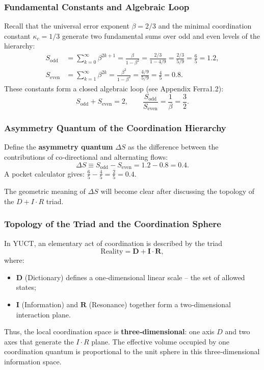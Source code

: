 \documentclass[12pt,a4paper]{article}
\begin{document}
	\subsubsection{Fundamental Constants and Algebraic Loop}
	
	Recall that the universal error exponent \(\beta = 2/3\) and the minimal coordination constant \(\kappa_c = 1/3\) generate two fundamental sums over odd and even levels of the hierarchy:
	\begin{align}
		S_{\mathrm{odd}} &= \sum_{k=0}^{\infty} \beta^{2k+1} = \frac{\beta}{1-\beta^2} = \frac{2/3}{1-4/9} = \frac{2/3}{5/9} = \frac{6}{5} = 1.2, \label{eq:Sodd_again}\\
		S_{\mathrm{even}} &= \sum_{k=1}^{\infty} \beta^{2k} = \frac{\beta^2}{1-\beta^2} = \frac{4/9}{5/9} = \frac{4}{5} = 0.8. \label{eq:Seven_again}
	\end{align}
	These constants form a closed algebraic loop (see Appendix Ferra1.2):
	\[
	S_{\mathrm{odd}} + S_{\mathrm{even}} = 2, \qquad \frac{S_{\mathrm{odd}}}{S_{\mathrm{even}}} = \frac{1}{\beta} = \frac{3}{2}.
	\]
	
	\subsubsection{Asymmetry Quantum of the Coordination Hierarchy}
	
	Define the \textbf{asymmetry quantum} \(\Delta S\) as the difference between the contributions of co‑directional and alternating flows:
	\[
	\Delta S \equiv S_{\mathrm{odd}} - S_{\mathrm{even}} = 1.2 - 0.8 = 0.4.
	\]
	A pocket calculator gives: \(\frac{6}{5} - \frac{4}{5} = \frac{2}{5} = 0.4.\)
	
	The geometric meaning of \(\Delta S\) will become clear after discussing the topology of the \(D+I\cdot R\) triad.
	
	\subsubsection{Topology of the Triad and the Coordination Sphere}
	
	In YUCT, an elementary act of coordination is described by the triad
	\[
	\text{Reality} = \mathbf{D} + \mathbf{I}\cdot\mathbf{R},
	\]
	where:
	\begin{itemize}
		\item \(\mathbf{D}\) (Dictionary) defines a one‑dimensional linear scale – the set of allowed states;
		\item \(\mathbf{I}\) (Information) and \(\mathbf{R}\) (Resonance) together form a two‑dimensional interaction plane.
	\end{itemize}
	Thus, the local coordination space is \textbf{three‑dimensional}: one axis \(D\) and two axes that generate the \(I\cdot R\) plane. The effective volume occupied by one coordination quantum is proportional to the unit sphere in this three‑dimensional information space.
	
\end{document}
